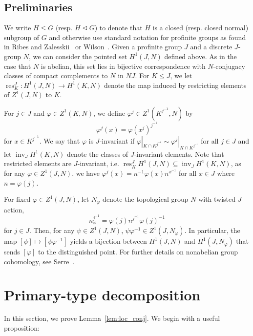\documentclass{amsart}
\theoremstyle{definition}
\theoremstyle{remark}
\numberwithin{equation}{section}
\newcommand{\normal}{\trianglelefteq}
\renewcommand{\phi}{\varphi}
\DeclareMathOperator{\inv}{inv}
\DeclareMathOperator{\res}{res}
\begin{document}
\subsection{Preliminaries}
\label{ss:note}

We write $H\leq G$ (resp. $H\normal G$) to denote that $H$ is a closed  (resp. closed normal) subgroup of $G$ and otherwise use standard notation for profinite groups as found in Ribes and Zalesskii~\cite{Rib10} or Wilson~\cite{Wil98}. Given a profinite group $J$ and a discrete $J$-group $N$, we can consider the pointed set $H^1(J,N)$ defined above. As in the case that $N$ is abelian, this set lies in bijective correspondence with $N$-conjugacy classes of compact complements to $N$ in $NJ$.
For $K\leq J$, we let $\res^J_K: H^1(J,N) \to H^1(K,N)$ denote the map induced by restricting elements of $Z^1(J,N)$ to $K$.

For $j\in J$ and $\phi\in Z^1(K,N)$, we define $\phi^j \in Z^1(K^{j^{-1}},N)$ by
\begin{equation}
	\label{eq:cocycle_act_def}
	\phi^j(x) = \phi(x^j)^{j^{-1}}
\end{equation}
for $x\in K^{j^{-1}}$. We say that $\phi$ is $J$-invariant if $\phi|_{K\cap K^{j^{-1}}} \sim \phi^j|_{K\cap K^{j^{-1}}}$ for all $j\in J$ and let $\inv_J H^1(K,N)$ denote the classes of $J$-invariant elements. Note that restricted elements are $J$-invariant, i.e. $\res^J_K H^1(J,N) \subseteq \inv_J H^1(K,N)$, as for any $\phi \in Z^1(J,N)$, we have $\phi^j(x) = n^{-1} \phi(x) n^{x^{-1}}$ for all $x\in J$ where $n=\phi(j)$.

For fixed $\phi \in Z^1(J,N)$, let $N_\phi$ denote the topological group $N$ with twisted $J$-action,
\begin{equation}
	\label{eq:N_twisted}
	n^{j^{-1}}_\phi = \phi(j) n^{j^{-1}} \phi(j)^{-1}
\end{equation}
for $j\in J$. Then, for any $\psi \in Z^1(J,N)$, $\psi\phi^{-1} \in Z^1(J, N_\phi)$. In particular, the map $[\psi] \mapsto [\psi\phi^{-1}]$ yields a bijection between $H^1(J,N)$ and $H^1(J,N_\phi)$ that sends $[\phi ]$ to the distinguished point. For further details on nonabelian group cohomology, see Serre~\cite[Sec.~I.5]{Ser02}.

\section{Primary-type decomposition}
\label{s:decomp}

In this section, we prove Lemma~\ref{lem:loc_conj}. We begin with a useful proposition:
\end{document}
